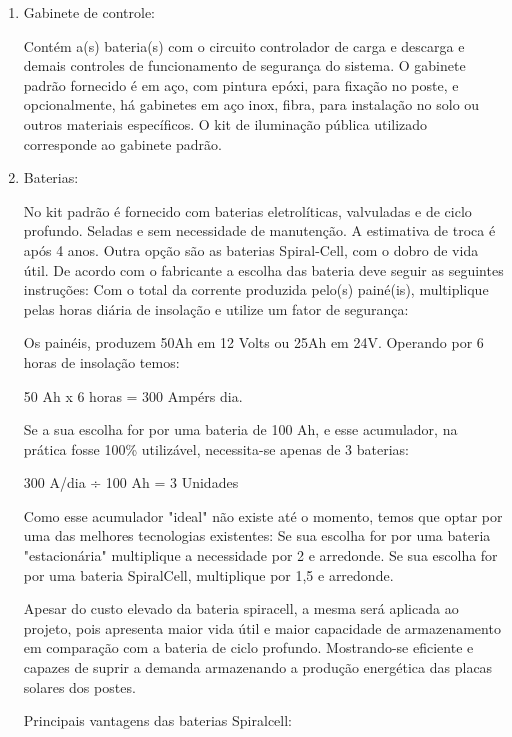 \begin{enumerate}
	\item Gabinete de controle:
	
	Contém a(s) bateria(s) com o circuito controlador de carga e descarga e demais controles de funcionamento de segurança do sistema. O gabinete padrão fornecido é em aço, com pintura epóxi, para fixação no poste, e opcionalmente, há gabinetes em aço inox, fibra, para instalação no solo ou outros materiais específicos. O kit de iluminação pública utilizado corresponde ao gabinete padrão. 
	
	\item Baterias:
	
	No kit padrão é fornecido com baterias eletrolíticas, valvuladas e de ciclo profundo. Seladas e sem necessidade de manutenção. A estimativa de troca é após 4 anos. Outra opção são as baterias Spiral-Cell, com o dobro de vida útil. 
De acordo com o fabricante a escolha das bateria deve seguir as seguintes instruções:
Com o total da corrente produzida pelo(s) painé(is), multiplique pelas horas diária de insolação e utilize um fator de segurança:
 
Os painéis, produzem 50Ah em 12 Volts ou 25Ah em 24V.
Operando por 6 horas de insolação temos:

\begin{center}
	50 Ah x 6 horas = 300 Ampérs dia.
\end{center}
  
Se a sua escolha for por uma bateria de 100 Ah, e esse acumulador, na prática fosse 100\% utilizável, necessita-se apenas de 3 baterias:

\begin{center}
 300 A/dia ÷ 100 Ah = 3 Unidades
\end{center}  
 
	Como esse acumulador "ideal" não existe até o momento, temos que optar por uma das melhores tecnologias existentes:
Se sua escolha for por uma bateria  "estacionária" multiplique a necessidade por 2 e arredonde.
Se sua escolha for por uma bateria SpiralCell, multiplique por 1,5 e arredonde.

	Apesar  do custo elevado da bateria spiracell, a mesma será aplicada ao projeto, pois apresenta maior vida útil e maior  capacidade de armazenamento em comparação com a bateria de ciclo profundo. Mostrando-se eficiente e capazes de suprir a demanda armazenando a produção energética das placas solares dos postes.

	Principais vantagens das baterias Spiralcell:
	

\end{enumerate}
